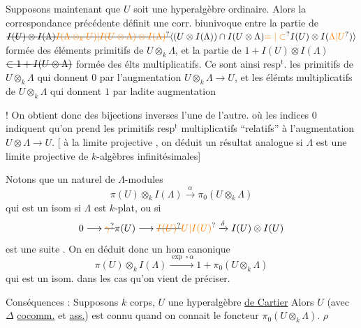 Supposons maintenant que $U$ soit une
hyperalgèbre ordinaire. Alors la correspondance
précédente définit une corr. biunivoque
entre la partie de $\deleted{I(U)\otimes I(\Lambda)}\deleted{\unsure{I(\Lambda\otimes_k U)|I(U\otimes\Lambda)\otimes I(\Lambda)}}\inserted{(U\otimes I(\Lambda))\cap I(U\otimes\Lambda)\unsure{=|\subset} I(U)\otimes I(\unsure{\Lambda|U})}$ formée
des éléments primitifs  de $U\otimes_k\Lambda$, et
la partie de $1+I(U)\otimes I(\Lambda)$ $\deleted{\subset 1+I(U\otimes\Lambda)}$
formée des élts multiplicatifs. Ce
sont ainsi resp$^{\mathrm t}$. les primitifs de
$U\otimes_k\Lambda$ qui donnent $0$ par l'augmentation
$U\otimes_k\Lambda\longrightarrow U$, et les élémts multiplicatifs de
$U\otimes_k\Lambda$ qui donnent $1$ par ladite augmentation

! On obtient donc des bijections inverses l'une de l'autre.
où les indices $0$ indiquent qu'on
prend les primitifs resp$^{\mathrm t}$ multiplicatifs
``relatifs'' à l'augmentation $U\otimes\Lambda\longrightarrow U$.
[ à la limite projective , on déduit
un résultat analogue si $\Lambda$ est une
limite projective de $k$-algèbres infinitésimales]

Notons que   un
 naturel de $\Lambda$-modules
\[
\pi(U)\otimes_k I(\Lambda)\xrightarrow{\alpha}\pi_0(U\otimes_k\Lambda)
\]
qui est un isom si $\Lambda$ est $k$-plat,
ou si
\[
0\longrightarrow\deleted{\unsure{\gamma}}\pi(U)\longrightarrow\deleted{\unsure{I(U)}}\unsure{U|I(U)}\xrightarrow{\delta} I(U)\otimes I(U)
\]
est une suite . On
en déduit donc un hom canonique
\[
\pi(U)\otimes_k I(\Lambda)\xrightarrow{\exp\circ\alpha}1+\pi_0(U\otimes_k\Lambda)
\]
qui est un isom. dans les cas
qu'on vient de préciser.

Conséquences : Supposons $k$ corps, $U$ une hyperalgèbre
 \uline{de Cartier} \unsure{$\rho$}
Alors $U$ (avec $\Delta$ \uline{cocomm.} et \uline{ass.}) est connu
quand on connait le foncteur $\pi_0(U\otimes_k\Lambda)$. $\rho$

